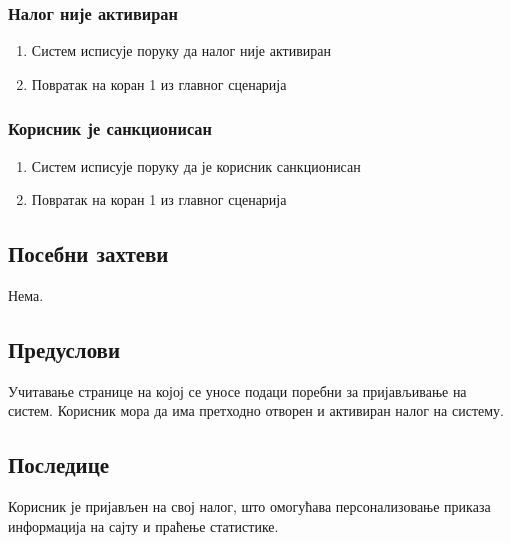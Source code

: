\subsubsection{Налог није активиран}
\begin{enumerate}[label=6.\arabic*]
    \item Систем исписује поруку да налог није активиран
    \item Повратак на коран 1 из главног сценарија
\end{enumerate}

\subsubsection{Корисник је санкционисан}
\begin{enumerate}[label=7.\arabic*]
    \item Систем исписује поруку да је корисник санкционисан
    \item Повратак на коран 1 из главног сценарија
\end{enumerate}

\subsection{Посебни захтеви}
Нема.

\subsection{Предуслови}
Учитавање странице на којој се уносе подаци поребни за пријављивање на систем.
Корисник мора да има претходно отворен и активиран налог на систему.

\subsection{Последице}
Корисник је пријављен на свој налог, што омогућава персонализовање приказа информација на сајту и праћење
статистике.
